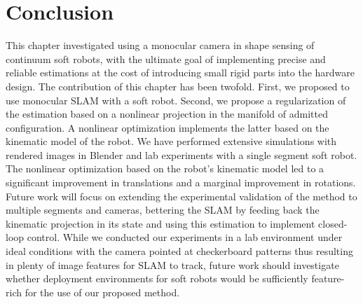 \section{Conclusion}
\label{sec:srslam:conclusions}

This chapter investigated using a monocular camera in shape sensing of continuum soft robots, with the ultimate goal of implementing precise and reliable estimations at the cost of introducing small rigid parts into the hardware design. The contribution of this chapter has been twofold. First, we proposed to use monocular SLAM with a soft robot. Second, we propose a regularization of the estimation based on a nonlinear projection in the manifold of admitted configuration. A nonlinear optimization implements the latter based on the kinematic model of the robot. We have performed extensive simulations with rendered images in Blender and lab experiments with a single segment soft robot. The nonlinear optimization based on the robot's kinematic model led to a significant improvement in translations and a marginal improvement in rotations. 
Future work will focus on extending the experimental validation of the method to multiple segments and cameras, bettering the SLAM by feeding back the kinematic projection in its state and using this estimation to implement closed-loop control.
While we conducted our experiments in a lab environment under ideal conditions with the camera pointed at checkerboard patterns thus resulting in plenty of image features for \gls{SLAM} to track, future work should investigate whether deployment environments for soft robots would be sufficiently feature-rich for the use of our proposed method.